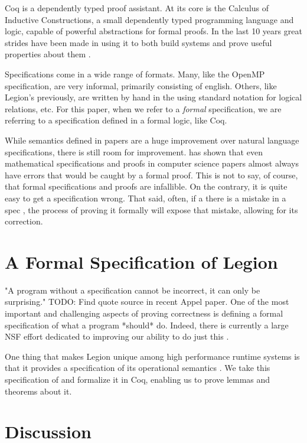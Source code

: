 Coq is a dependently typed proof assistant. At its core is the Calculus of
Inductive Constructions, a small dependently typed programming language and
logic, capable of powerful abstractions for formal proofs. In the last 10 years 
great strides have been made in using it to both build systems and prove useful
properties about them \cite{compcert, certicoq, chlipala...}. 

Specifications come in a wide range of formats. Many, like the OpenMP
specification, are very informal, primarily consisting of english. Others, like
Legion's previously, are written by hand in the using standard notation for
logical relations, etc. For this paper, when we refer to a \emph{formal}
specification, we are referring to a specification defined in a formal logic,
like Coq. 

While semantics defined in papers are a huge improvement over natural language
specifications, there is still room for improvement. \cite{formalspec vs paper} has 
shown that even mathematical specifications and proofs in computer science
papers almost always have errors that would be caught by a formal proof. This is not to say,
of course, that formal specifications and proofs are infallible. On the contrary, it 
is quite easy to get a specification wrong. That said, often, if a there is a mistake in a spec
, the process of proving it formally will expose that mistake, allowing for its correction. 

\section{A Formal Specification of Legion}

"A program without a specification cannot be incorrect, it can only be
surprising." TODO: Find quote source in recent Appel paper. One of the most
important and challenging aspects of proving correctness is defining a formal
specification of what a program *should* do. Indeed, there is currently a large
NSF effort dedicated to improving our ability to do just this \cite{deepspec}. 

One thing that makes Legion unique among high performance runtime systems is
that it provides a specification of its operational semantics \cite{oopsla13}.
We take this specification of and formalize it in Coq, enabling us to prove
lemmas and theorems about it.

\section{Discussion}

